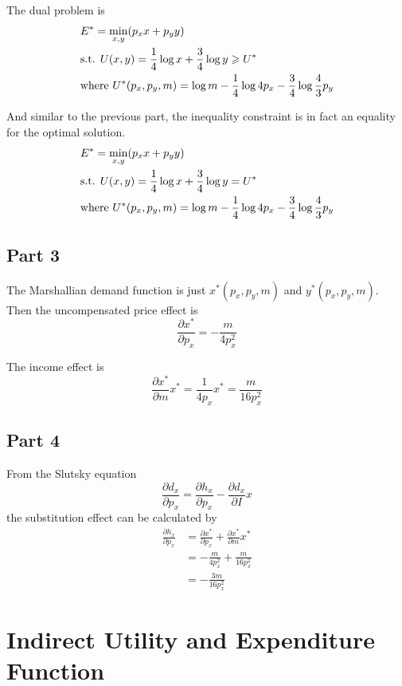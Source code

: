 \documentclass{article}
\begin{document}
The dual problem is
\begin{align*}
	&E^*=\min_{x,y}(p_xx+p_yy)\\
	&\textup{s.t. }U(x,y)=\frac{1}{4}\log x+\frac{3}{4}\log y\geqslant U^*\\
	&\textup{where }U^*(p_x,p_y,m)=\log m-\frac{1}{4}\log 4p_x-\frac{3}{4}\log\frac{4}{3}p_y
\end{align*}

And similar to the previous part, the inequality constraint is in fact an equality for the optimal solution. 
\begin{align*}
	&E^*=\min_{x,y}(p_xx+p_yy)\\
	&\textup{s.t. }U(x,y)=\frac{1}{4}\log x+\frac{3}{4}\log y=U^*\\
	&\textup{where }U^*(p_x,p_y,m)=\log m-\frac{1}{4}\log 4p_x-\frac{3}{4}\log\frac{4}{3}p_y
\end{align*}

\subsection{Part 3}
The Marshallian demand function is just $x^*(p_x,p_y,m)$ and $y^*(p_x,p_y,m)$. Then the uncompensated price effect is
\begin{equation*}
	\frac{\partial x^*}{\partial p_x}=-\frac{m}{4p_x^2}
\end{equation*}

The income effect is
\begin{equation*}
	\frac{\partial x^*}{\partial m}x^*=\frac{1}{4p_x}x^*=\frac{m}{16p_x^2}
\end{equation*}

\subsection{Part 4}
From the Slutsky equation
\begin{equation*}
	\frac{\partial d_x}{\partial p_x}=\frac{\partial h_x}{\partial p_x}-\frac{\partial d_x}{\partial I}x
\end{equation*}
the substitution effect can be calculated by
\begin{align*}
	\frac{\partial h_x}{\partial p_x}&=\frac{\partial x^*}{\partial p_x}+\frac{\partial x^*}{\partial m}x^*\\
	&=-\frac{m}{4p_x^2}+\frac{m}{16p_x^2}\\
	&=-\frac{3m}{16p_x^2}
\end{align*}

\section{Indirect Utility and Expenditure Function}
\end{document}
